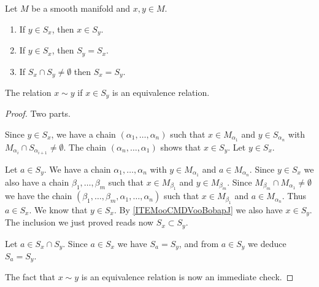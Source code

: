 \begin{lemma}		\label{LEMooIFABooVGFYfI}
	Let \( M\) be a smooth manifold and \( x,y\in M\).
	\begin{enumerate}
		\item	\label{ITEMooCMDVooBobapJ}
		      If \( y\in S_x\), then \( x\in S_y\).
		\item		\label{ITEMooIIBSooNNXIFj}
		      If \( y\in S_x\), then \( S_y=S_x\).
		\item		\label{ITEMooNGSEooIZuiMU}
		      If \( S_x\cap S_y\neq\emptyset\) then \( S_x=S_y\).
	\end{enumerate}
	The relation \( x\sim y\) if \( x\in S_y\) is an equivalence relation.
\end{lemma}

\begin{proof}
	Two parts.
	\begin{subproof}
		Since \( y\in S_x\), we have a chain \( (\alpha_1,\ldots,\alpha_n)\) such that \( x\in M_{\alpha_1}\) and \( y\in S_{\alpha_n}\) with \( M_{\alpha_i}\cap S_{\alpha_{i+1}}\neq \emptyset\). The chain \( (\alpha_n,\ldots,\alpha_1)\) shows that \( x\in S_y\).
		Let \( y\in S_x\).
		\begin{subproof}
			\spitem[\( S_y\subset S_x\)]
			Let \( a\in S_y\). We have a chain \( \alpha_1,\ldots,\alpha_n\) with \( y\in M_{\alpha_1}\) and \( a\in M_{\alpha_n}\). Since \( y\in S_x\) we also have a chain \( \beta_1,\ldots,\beta_m\) such that \( x\in M_{\beta_1}\) and \( y\in M_{\beta_m}\). Since \( M_{\beta_m}\cap M_{\alpha_1}\neq \emptyset\) we have the chain \( (\beta_1,\ldots,\beta_m,\alpha_1,\ldots,\alpha_n)\) such that \( x\in M_{\beta_1}\) and \( a\in M_{\alpha_n}\). Thus \( a\in S_x\).
			\spitem[\( S_x\subset S_y\)]
			We know that \( y\in S_x\). By \ref{ITEMooCMDVooBobapJ} we also have \( x\in S_y\). The inclusion we just proved reads now \( S_x\subset S_y\).
		\end{subproof}
		Let \( a\in S_x\cap S_y\). Since \( a\in S_x\) we have \( S_a=S_y\), and from \( a\in S_y\) we deduce \( S_a=S_y\).
	\end{subproof}

	The fact that \( x\sim y\) is an equivalence relation is now an immediate check.
\end{proof}

